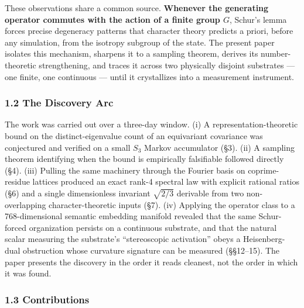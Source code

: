 \documentclass[
  11pt,
]{article}
\begin{document}
These observations share a common source. \textbf{Whenever the
generating operator commutes with the action of a finite group \(G\)},
Schur's lemma forces precise degeneracy patterns that character theory
predicts a priori, before any simulation, from the isotropy subgroup of
the state. The present paper isolates this mechanism, sharpens it to a
sampling theorem, derives its number-theoretic strengthening, and traces
it across two physically disjoint substrates --- one finite, one
continuous --- until it crystallizes into a measurement instrument.

\subsubsection{1.2 The Discovery Arc}\label{the-discovery-arc}

The work was carried out over a three-day window. (i) A
representation-theoretic bound on the distinct-eigenvalue count of an
equivariant covariance was conjectured and verified on a small \(S_3\)
Markov accumulator (§3). (ii) A sampling theorem identifying when the
bound is empirically falsifiable followed directly (§4). (iii) Pulling
the same machinery through the Fourier basis on coprime-residue lattices
produced an exact rank-4 spectral law with explicit rational ratios (§6)
and a single dimensionless invariant \(\sqrt{2/3}\) derivable from two
non-overlapping character-theoretic inputs (§7). (iv) Applying the
operator class to a 768-dimensional semantic embedding manifold revealed
that the same Schur-forced organization persists on a continuous
substrate, and that the natural scalar measuring the substrate's
``stereoscopic activation'' obeys a Heisenberg-dual obstruction whose
curvature signature can be measured (§§12--15). The paper presents the
discovery in the order it reads cleanest, not the order in which it was
found.

\subsubsection{1.3 Contributions}\label{contributions}
\end{document}
